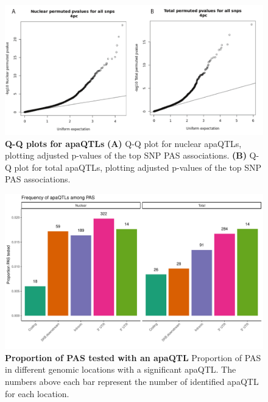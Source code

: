 \begin{figure}[!htb]
\centering \includegraphics[width=5in]{img/ch02/Fig2_figuresupplement1.pdf}
\caption[Q-Q plots for apaQTLs]{\textbf{Q-Q plots for apaQTLs} {\bf (A)} Q-Q plot for nuclear apaQTLs, plotting adjusted p-values of the top SNP PAS associations. {\bf (B)} Q-Q plot for total apaQTLs, plotting adjusted p-values of the top SNP PAS associations.}
\label{fig:QQplots}
\end{figure}
\clearpage

\begin{figure}[!htb]
\centering
\includegraphics[width=5in]{img/ch02/Fig2_figuresuplement2.pdf}
\caption[Proportion of PAS tested with an apaQTL]{\textbf{Proportion of PAS tested with an apaQTL} Proportion of PAS in different genomic locations with a significant apaQTL. The numbers above each bar represent the number of identified apaQTL for each location. }
\label{fig:propPASdAPA}
\end{figure}
\clearpage

